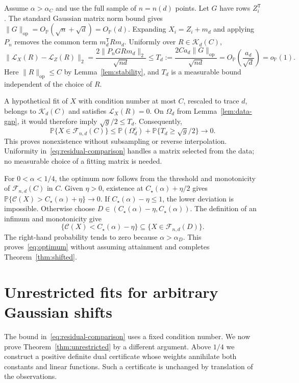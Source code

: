 \documentclass[11pt]{article}
\newcommand{\Pbb}{\mathbb P}
\newcommand{\opnorm}[1]{\lVert#1\rVert_{\mathrm{op}}}
\newcommand{\norm}[1]{\lVert#1\rVert}
\newcommand{\Fit}{\mathcal F}
\newcommand{\Copt}{\mathcal C}
\newcommand{\OP}{O_{\Pbb}}
\newcommand{\oP}{o_{\Pbb}}
\theoremstyle{remark}
\begin{document}
Assume $\alpha>\alpha_C$ and use the full sample of $n=n(d)$ points.
Let $G$ have rows $Z_i^{\mathsf T}$. The standard Gaussian matrix norm
bound gives $\opnorm G=\OP(\sqrt n+\sqrt d)=\OP(d)$.
Expanding $X_i=Z_i+m_d$ and applying $P_n$ removes the common term
$m_d^{\mathsf T}Rm_d$. Uniformly over $R\in\mathcal K_d(C)$,
\begin{equation}\label{eq:residual-comparison}
 \norm{\mathcal L_X(R)-\mathcal L_Z(R)}_2
 =\frac{2\norm{P_nGRm_d}_2}{\sqrt{nd}}
 \le T_d:=\frac{2Ca_d\opnorm G}{\sqrt{nd}}
 =\OP\left(\frac{a_d}{\sqrt d}\right)=\oP(1).
\end{equation}
Here $\opnorm R\le C$ by Lemma~\ref{lem:stability}, and $T_d$ is a
measurable bound independent of the choice of $R$.

A hypothetical fit of $X$ with condition number at most $C$, rescaled
to trace $d$, belongs to $\mathcal K_d(C)$ and satisfies
$\mathcal L_X(R)=0$. On $\Omega_d$ from Lemma~\ref{lem:data-gap},
it would therefore imply $\sqrt g/2\le T_d$. Consequently,
\[
 \Pbb\{X\in\Fit_{n,d}(C)\}
 \le\Pbb(\Omega_d^c)+\Pbb\{T_d\ge\sqrt g/2\}\longrightarrow0.
\]
This proves nonexistence without subsampling or reverse interpolation.
Uniformity in~\eqref{eq:residual-comparison} handles a matrix selected
from the data; no measurable choice of a fitting matrix is needed.

For $0<\alpha<1/4$, the optimum now follows from the threshold and
monotonicity of $\Fit_{n,d}(C)$ in $C$. Given $\eta>0$, existence at
$C_\star(\alpha)+\eta/2$ gives
$\Pbb\{\Copt(X)>C_\star(\alpha)+\eta\}\to0$.
If $C_\star(\alpha)-\eta\le1$, the lower deviation is impossible.
Otherwise choose $D\in(C_\star(\alpha)-\eta,C_\star(\alpha))$.
The definition of an infimum and monotonicity give
\[
 \{\Copt(X)<C_\star(\alpha)-\eta\}
       \subseteq\{X\in\Fit_{n,d}(D)\}.
\]
The right-hand probability tends to zero because $\alpha>\alpha_D$.
This proves~\eqref{eq:optimum} without assuming attainment and completes
Theorem~\ref{thm:shifted}.

\section{Unrestricted fits for arbitrary Gaussian shifts}
\label{sec:unrestricted}

The bound in~\eqref{eq:residual-comparison} uses a fixed condition
number. We now prove Theorem~\ref{thm:unrestricted} by a different
argument. Above $1/4$ we construct a positive definite dual certificate
whose weights annihilate both constants and linear functions. Such a
certificate is unchanged by translation of the observations.
\end{document}
